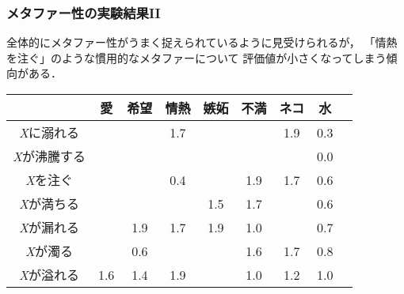 \documentclass[12pt,usepdftitle=false]{beamer}
\begin{document}
\begin{frame}
    \frametitle{メタファー性の実験結果II}

     全体的にメタファー性がうまく捉えられているように見受けられるが，
     「情熱を注ぐ」のような慣用的なメタファーについて
     評価値が小さくなってしまう傾向がある．

    \begin{table}\centering
        \footnotesize
        \begin{tabular}{|c|c|c|c|c|c|c|c|c|}
        \hline
            & 愛 & 希望 & 情熱 & 嫉妬 & 不満 & ネコ & 水 \\
        \hline
        \emph{X}に溺れる & \cellcolor{sOrange}\textcolor{white}{2.4} & \cellcolor{sOrange}\textcolor{white}{2.6} & \cellcolor{sBlonde}1.7 & \cellcolor{sDarkRed}\textcolor{white}{3.4} & \cellcolor{sDarkRed}\textcolor{white}{3.0} & \cellcolor{sBlonde}1.9 & 0.3 \\
        \hline
        \emph{X}が沸騰する & \cellcolor{sOrange}\textcolor{white}{2.9} & \cellcolor{sOrange}\textcolor{white}{2.3} & \cellcolor{sOrange}\textcolor{white}{2.5} & \cellcolor{sOrange}\textcolor{white}{2.4} & \cellcolor{sOrange}\textcolor{white}{2.4} & \cellcolor{sOrange}\textcolor{white}{2.1} & 0.0 \\
        \hline
        \emph{X}を注ぐ & \cellcolor{sOrange}\textcolor{white}{2.0} & \cellcolor{sOrange}\textcolor{white}{2.5} & 0.4 & \cellcolor{sOrange}\textcolor{white}{2.9} & \cellcolor{sBlonde}1.9 & \cellcolor{sBlonde}1.7 & 0.6 \\
        \hline
        \emph{X}が満ちる & \cellcolor{sOrange}\textcolor{white}{2.7} & \cellcolor{sOrange}\textcolor{white}{2.1} & \cellcolor{sOrange}\textcolor{white}{2.3} & \cellcolor{sBlonde}1.5 & \cellcolor{sBlonde}1.7 & \cellcolor{sOrange}\textcolor{white}{2.8} & 0.6 \\
        \hline
        \emph{X}が漏れる & \cellcolor{sOrange}\textcolor{white}{2.7} & \cellcolor{sBlonde}1.9 & \cellcolor{sBlonde}1.7 & \cellcolor{sBlonde}1.9 & \cellcolor{sBlonde}1.0 & \cellcolor{sOrange}\textcolor{white}{2.0} & 0.7 \\
        \hline
        \emph{X}が濁る & \cellcolor{sOrange}\textcolor{white}{2.6} & 0.6 & \cellcolor{sOrange}\textcolor{white}{2.2} & \cellcolor{sOrange}\textcolor{white}{2.0} & \cellcolor{sBlonde}1.6 & \cellcolor{sBlonde}1.7 & 0.8 \\
        \hline
            \emph{X}が溢れる & \cellcolor{sBlonde}1.6 & \cellcolor{sBlonde}1.4 & \cellcolor{sBlonde}1.9 & \cellcolor{sDarkRed}\textcolor{white}{3.2} & \cellcolor{sBlonde}1.0 & \cellcolor{sBlonde}1.2 & \cellcolor{sBlonde}1.0 \\

\end{tabular}
\end{table}
\end{frame}
\end{document}
